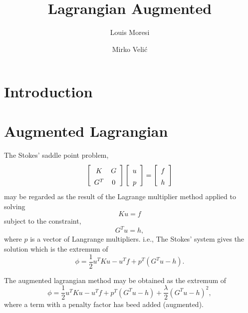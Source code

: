 \documentclass[]{svjour3}
\def\beq{\begin{equation}}
\def\eeq{\end{equation}}
\begin{document}
\title{Lagrangian Augmented}
\author{ Louis Moresi \and Mirko Veli\'c}


\maketitle




\section{Introduction}

\section{Augmented Lagrangian}
The Stokes' saddle point problem,
\beq
   \left[\begin{array}{cc}
       K   & G \rule{0pt}{13pt}\\
       G^T & 0 \rule{0pt}{13pt}
   \end{array}\right]
   \left[
\begin{array}{c}
u  \rule{0pt}{13pt}\\
p   \rule{0pt}{13pt}
\end{array}
\right] 
=
\left[\begin{array}{c}
f  \rule{0pt}{13pt}\\
h   \rule{0pt}{13pt}
\end{array}
\right]
\label{stokes}
\eeq
may be regarded as the result of the Lagrange multiplier method applied to solving
\beq
   K u = f
\eeq
subject to the constraint,
\beq
  G^T u  = h,
\eeq
where $p$ is a vector of Langrange multipliers. i.e.,
The Stokes' system gives the solution which is the extremum of
\beq
    \phi = \frac{1}{2}u^T K u - u^T f + p^T(G^T u -h).
\eeq

The augmented lagrangian method may be obtained as the extremum of
\beq
    \phi = \frac{1}{2}u^T K u - u^T f + p^T(G^T u -h) + \frac{\lambda}{2}(G^T u -h)^2,\label{al}
\eeq
where a term with a penalty factor has beed added (augmented).
\end{document}
